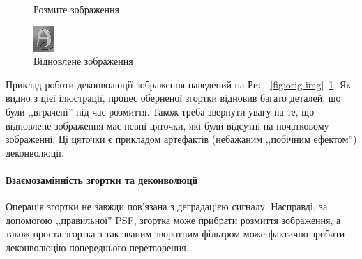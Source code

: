 \documentclass{diploma}
\begin{document}
\begin{figure}
            \caption{Розмите зображення}\label{fig:conv-img}
          \endminipage\hfill
            \includegraphics[width=\linewidth]{ADecon.jpg}
            \caption{Відновлене зображення}\label{fig:deconv-img}
          \endminipage\hfill
      \end{figure}

      Приклад роботи деконволюції зображення наведений на
      Рис.~\ref{fig:orig-img}--\ref{fig:deconv-img}.
      Як видно з цієї ілюстрації, процес оберненої згортки відновив багато
      деталей, що були ,,втрачені'' під час розмиття.
      Також треба звернути увагу на те, що відновлене зображення має певні
      цяточки, які були відсутні на початковому зображенні.
      Ці цяточки є прикладом артефактів (небажаним ,,побічним ефектом'')
      деконволюції.\cite{deconvolve-index}
      \paragraph{Взаємозамінність згортки та деконволюції}
        Операція згортки не завжди пов’язана з деградацією сигналу.
        Насправді, за допомогою ,,правильної'' PSF, згортка може прибрати розмиття
        зображення, а також проста згортка з так званим зворотним фільтром
        може фактично зробити деконволюцію попереднього перетворення.
\end{document}
